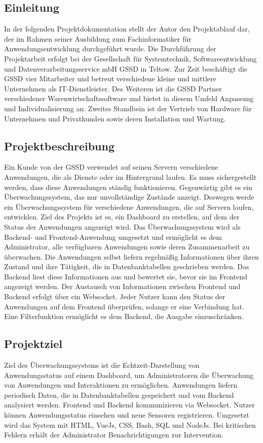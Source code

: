 \begin{flushleft}
\setcounter{page}{1}
\section{Einleitung}
In der folgenden Projektdokumentation stellt der Autor den Projektablauf dar, der im Rahmen seiner
Ausbildung zum Fachinformatiker für Anwendungsentwicklung durchgeführt wurde. Die Durchführung der
Projektarbeit erfolgt bei der Gesellschaft für Systemtechnik, Softwareentwicklung und
Datenverarbeitungsservice mbH \acs{GSSD} in Teltow. Zur Zeit beschäftigt die \acs{GSSD} vier Mitarbeiter und
betreut verschiedene kleine und mittlere Unternehmen als IT-Dienstleister. Des Weiteren ist die \acs{GSSD}
Partner verschiedener Warenwirtschaftssoftware und bietet in diesem Umfeld Anpassung und
Individualisierung an. Zweites Standbein ist der Vertrieb von Hardware für Unternehmen und Privatkunden
sowie deren Installation und Wartung.



\subsection{Projektbeschreibung}
Ein Kunde von der \acs{GSSD} verwendet auf seinen Servern verschiedene Anwendungen, die als
Dienste oder im Hintergrund laufen. Es muss sichergestellt werden, dass diese Anwendungen
ständig funktionieren. Gegenwärtig gibt es ein Überwachungssystem, das nur unvollständige
Zustände anzeigt. Deswegen werde ein Überwachungssystem für verschiedene Anwendungen, die auf Servern laufen, entwicklen.
Ziel des Projekts ist es, ein Dashboard zu erstellen, auf dem der Status der Anwendungen angezeigt wird.
Das Überwachungssystem wird als Backend- und Frontend-Anwendung umgesetzt und ermöglicht es dem Administrator, alle verfügbaren Anwendungen sowie deren Zusammenarbeit zu überwachen.
Die Anwendungen selbst liefern regelmäßig Informationen über ihren Zustand und ihre Tätigkeit, die in Datenbanktabellen geschrieben werden.
Das Backend liest diese Informationen aus und bewertet sie, bevor sie im Frontend angezeigt werden.
Der Austausch von Informationen zwischen Frontend und Backend erfolgt über ein Websocket.
Jeder Nutzer kann den Status der Anwendungen auf dem Frontend überprüfen, solange er eine Verbindung hat.
Eine Filterfunktion ermöglicht es dem Backend, die Ausgabe einzuschränken.



\subsection{Projektziel}
Ziel des Überwachungssystems ist die Echtzeit-Darstellung von Anwendungsstatus auf einem Dashboard,
um Administratoren die Überwachung von Anwendungen und Interaktionen zu ermöglichen. Anwendungen liefern periodisch Daten,
die in Datenbanktabellen gespeichert und vom Backend analysiert werden. Frontend und Backend kommunizieren via Websocket.
Nutzer können Anwendungsstatus einsehen und neue Sensoren registrieren. Umgesetzt wird das System mit
HTML, VueJs, CSS, Bash, SQL und NodeJs. Bei kritischen Fehlern erhält der Administrator Benachrichtigungen zur Intervention.



\end{flushleft}
